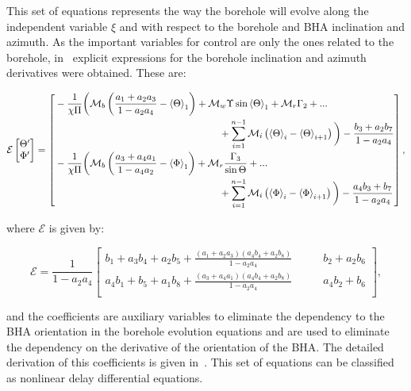 This set of equations represents the way the borehole will evolve along the independent variable $\xi$ and with respect to the borehole and BHA inclination and azimuth. As the important variables for control are only the ones related to the borehole, in~\cite{Monsieurs2015} explicit expressions for the borehole inclination and azimuth derivatives were obtained. These are:

\begin{equation}
	\mathcal{E} \begin{bmatrix}
	{\Theta'}\\
	{\Phi'}
	\end{bmatrix}
	=
	\begin{bmatrix}\begin{aligned}
	&- \frac{1}{{\chi \Pi }}\bigg(\mathcal{M}_b\left(\frac{{a_1} + {a_2}{a_3}}{1-{a_2}{a_4}}-{{\rm{\langle\Theta\rangle }}_1}\right)+{\mathcal{M}_w}\Upsilon \sin {{\rm{\langle\Theta\rangle }}_1} + {\mathcal{M}_r}{\Gamma _2}+...
	\\
	&\kern5.9cm+ \mathop \sum \limits_{i = 1}^{n - 1} {\mathcal{M}_i}\left( {{{\rm{\langle\Theta\rangle }}_i} - {{\rm{\langle\Theta\rangle }}_{i + 1}}} \right)\bigg) - \frac{b_3+a_2b_7}{1-a_2a_4}   \\
	&- \frac{1}{{\chi \Pi }}\bigg(\mathcal{M}_b\left(\frac{a_3+a_4a_1}{1-a_4a_2 }-{{\rm{\langle\Phi\rangle }}_1}\right)+ {\mathcal{M}_r}\frac{\Gamma _3}{\sin\Theta}+...
	\\
	&\kern5.9cm+ \mathop \sum \limits_{i = 1}^{n - 1} {\mathcal{M}_i}\left( {{{\rm{\langle\Phi\rangle }}_i} - {{\rm{\langle\Phi\rangle }}_{i + 1}}} \right)\bigg)
	-\frac{a_4b_3+b_7}{1-a_2a_4}
	\end{aligned}\end{bmatrix},
	\label{eq:finalmodel}
\end{equation}

where $\mathcal{E}$ is given by:

\begin{equation}
\mathcal{E} = \frac{1}{1-a_2a_4}
	\begin{bmatrix}
	b_1 + a_3b_4 + a_2b_5 +\frac{(a_1+a_2a_3)(a_4b_4+a_2b_8)}{1-a_2a_4} & \qquad b_2+a_2b_6\\
	a_4b_1 + b_5 + a_1b_8 +\frac{(a_3+a_4a_1)(a_4b_4+a_2b_8)}{1-a_2a_4} & \qquad a_4b_2+b_6 \\
	\end{bmatrix},
\end{equation}

and the coefficients  are auxiliary variables to eliminate the dependency to the BHA orientation in the borehole evolution equations and  are used to eliminate the dependency on the derivative of the orientation of the BHA. The detailed derivation of this coefficients is given in~\cite{Monsieurs2015}. This set of equations can be classified as nonlinear delay differential equations. 

